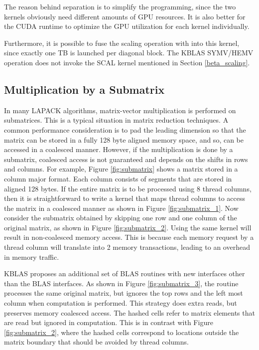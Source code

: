 The reason behind separation is to simplify the programming, since the two kernels obviously need different 
amounts of GPU resources. It is also better for the CUDA runtime to optimize the GPU utilization for each kernel individually.

Furthermore, it is possible to fuse the scaling operation with  into this kernel, since exactly one TB is launched per diagonal 
block. The KBLAS SYMV/HEMV operation does not invoke the SCAL kernel mentioned in Section \ref{beta_scaling}. 

\subsection{Multiplication by a Submatrix}
\label{submatrix}
In many LAPACK algorithms, matrix-vector multiplication is performed on submatrices. This is a typical situation in matrix reduction techniques. 
A common performance consideration is to pad the leading dimension so that the matrix can be stored in a fully 128 byte aligned memory space, and 
so, can be accessed in a coalesced manner. However, if the multiplication is done by a submatrix, coalesced access is not guaranteed and depends on the 
shifts in rows and columns. For example, Figure \ref{fig:submatrix} shows a matrix stored in a column major format. Each column consists of segments that 
are stored in aligned 128 bytes. If the entire matrix is to be processed using 8 thread columns, then it is straightforward to write a kernel 
that maps thread columns to access 
the matrix in a coalesced manner as shown in Figure \ref{fig:submatrix_1}. 
Now consider the submatrix obtained by skipping one row and one column of the original matrix, as shown 
in Figure \ref{fig:submatrix_2}. 
Using the same kernel will result in non-coalesced memory access. 
This is because each memory request by a thread column will translate into 2 memory transactions, 
leading to an overhead in memory traffic. 

KBLAS proposes an additional set of BLAS routines with new interfaces other than the BLAS interfaces. As shown in Figure \ref{fig:submatrix_3}, the routine processes the same original 
matrix, but ignores the top rows and the left most column when computation is performed. This strategy does extra reads, but preserves memory coalesced 
access. The hashed cells refer to matrix elements that are read 
but ignored in computation. This is in contrast with Figure \ref{fig:submatrix_2}, where 
the hashed cells correspond to locations outside the matrix boundary that should be avoided by thread columns. 


